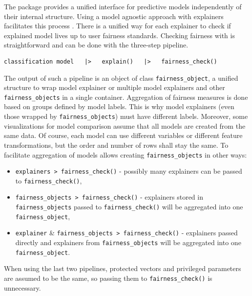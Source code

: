 The  package provides a unified interface for predictive
models independently of their internal structure. Using a model agnostic
approach with  explainers facilitates this process
\citep{JMLRv19}. There is a unified way for each explainer to check if
explained model lives up to user fairness standards. Checking fairness
with  is straightforward and can be done with the
three-step pipeline.

\begin{verbatim}
classification model   |>   explain()   |>   fairness_check() 
\end{verbatim}

The output of such a pipeline is an object of class
\texttt{fairness\_object}, a unified structure to wrap model explainer
or multiple model explainers and other \texttt{fairness\_objects} in a
single container. Aggregation of fairness measures is done based on
groups defined by model labels. This is why model explainers (even those
wrapped by \texttt{fairness\_objects}) must have different labels.
Moreover, some visualizations for model comparison assume that all
models are created from the same data. Of course, each model can use
different variables or different feature transformations, but the order
and number of rows shall stay the same. To facilitate aggregation of
models  allows creating \texttt{fairness\_objects} in
other ways:

\begin{itemize}
\tightlist
\item
  \texttt{explainers\ \textbar{}\textgreater{}\ fairness\_check()} -
  possibly many explainers can be passed to \texttt{fairness\_check()},
\item
  \texttt{fairness\_objects\ \textbar{}\textgreater{}\ fairness\_check()}
  - explainers stored in \texttt{fairness\_objects} passed to
  \texttt{fairness\_check()} will be aggregated into one
  \texttt{fairness\_object},
\item
  \texttt{explainer} \&
  \texttt{fairness\_objects\ \textbar{}\textgreater{}\ fairness\_check()}
  - explainers passed directly and explainers from
  \texttt{fairness\_objects} will be aggregated into one
  \texttt{fairness\_object}.
\end{itemize}

When using the last two pipelines, protected vectors and privileged
parameters are assumed to be the same, so passing them to
\texttt{fairness\_check()} is unnecessary.

